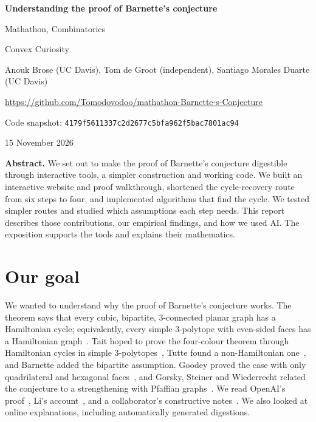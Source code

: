 \documentclass[11pt,a4paper]{article}
\begin{document}
\begin{center}
{\LARGE\bfseries Understanding the proof of Barnette's conjecture}\par
\vspace{4pt}
{\large Mathathon, Combinatorics}\par
\vspace{5pt}
Convex Curiosity\par
Anouk Brose (UC Davis), Tom de Groot (independent), Santiago Morales Duarte (UC Davis)\par
\vspace{4pt}
{\footnotesize
\url{https://github.com/Tomodovodoo/mathathon-Barnette-s-Conjecture}\par
Code snapshot: \texttt{4179f5611337c2d2677c5bfa962f5bac7801ac94}\par
15 November 2026}
\end{center}
\vspace{-2pt}

\textbf{Abstract.} We set out to make the proof of Barnette's conjecture digestible through interactive tools, a simpler construction and working code. We built an interactive website and proof walkthrough, shortened the cycle-recovery route from six steps to four, and implemented algorithms that find the cycle. We tested simpler routes and studied which assumptions each step needs. This report describes those contributions, our empirical findings, and how we used AI. The exposition supports the tools and explains their mathematics.

\section{Our goal}
We wanted to understand why the proof of Barnette's conjecture works. The theorem says that every cubic, bipartite, $3$-connected planar graph has a Hamiltonian cycle; equivalently, every simple $3$-polytope with even-sided faces has a Hamiltonian graph~\cite{BarnetteConj}. Tait hoped to prove the four-colour theorem through Hamiltonian cycles in simple $3$-polytopes~\cite{Tait}, Tutte found a non-Hamiltonian one~\cite{Tutte}, and Barnette added the bipartite assumption. Goodey proved the case with only quadrilateral and hexagonal faces~\cite{Goodey}, and Gorsky, Steiner and Wiederrecht related the conjecture to a strengthening with Pfaffian graphs~\cite{GSW}. We read OpenAI's proof~\cite{OpenAI}, Li's account~\cite{Li}, and a collaborator's constructive notes~\cite{Constructive}. We also looked at online explanations, including automatically generated digestions.
\end{document}
